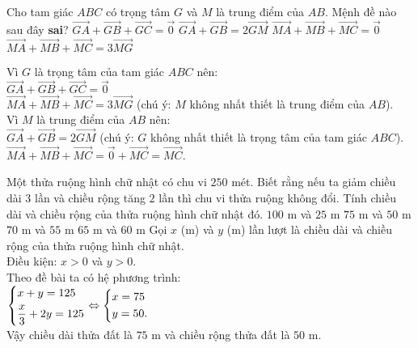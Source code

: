 \begin{ex}%
 Cho tam giác $ABC$ có trọng tâm $G$ và $M$ là trung điểm của $AB$. Mệnh đề nào sau đây \textbf{sai}?
 \choice
  {$\vec{GA} + \vec{GB} + \vec{GC} = \vec{0}$}
  {$\vec{GA} + \vec{GB} = 2\vec{GM}$}
  {\True $\vec{MA} + \vec{MB} + \vec{MC} = \vec{0}$}
  {$\vec{MA} + \vec{MB} + \vec{MC} = 3\vec{MG}$}
 \loigiai
 {
 \immini
 {
 Vì $G$ là trọng tâm của tam giác $ABC$ nên:\\
 $\vec{GA} + \vec{GB} + \vec{GC} = \vec{0}$\\
 $\vec{MA} + \vec{MB} + \vec{MC} = 3\vec{MG}$ (chú ý: $M$ không nhất thiết là trung điểm của $AB$).\\
 Vì $M$ là trung điểm của $AB$ nên:\\
 $\vec{GA} + \vec{GB} = 2\vec{GM}$ (chú ý: $G$ không nhất thiết là trọng tâm của tam giác $ABC$).\\
 $\vec{MA} + \vec{MB} + \vec{MC} = \vec{0} + \vec{MC} = \vec{MC}$.
 }
 {
 }
 }
\end{ex}


\begin{ex}%
 Một thửa ruộng hình chữ nhật có chu vi $250$ mét. Biết rằng nếu ta giảm chiều dài $3$ lần và chiều rộng tăng $2$ lần thì chu vi thửa ruộng không đổi. Tính chiều dài và chiều rộng của thửa ruộng hình chữ nhật đó.
 \choice
  {$100$ m và $25$ m}
  {\True $75$ m và $50$ m}
  {$70$ m và $55$ m}
  {$65$ m và $60$ m}
 \loigiai
 {
 Gọi $x$ (m) và $y$ (m) lần lượt là chiều dài và chiều rộng của thửa ruộng hình chữ nhật.\\
 Điều kiện: $x >0$ và $y>0$.\\
 Theo đề bài ta có hệ phương trình:\\
 $\left\{\begin{aligned}& x + y = 125 \\& \dfrac{x}{3} + 2y = 125\end{aligned}\right. \Leftrightarrow \left\{\begin{aligned}& x = 75 \\& y = 50.\end{aligned}\right.$\\
 Vậy chiều dài thửa đất là $75$ m  và chiều rộng thửa đất là $50$ m.
 }
\end{ex}


